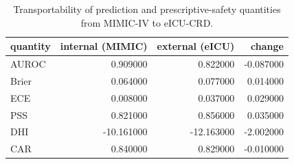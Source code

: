 \begin{table}
\caption{Transportability of prediction and prescriptive-safety quantities from MIMIC-IV to eICU-CRD.}
\label{tab:external}
\begin{tabular}{lrrr}
\toprule
quantity & internal (MIMIC) & external (eICU) & change \\
\midrule
AUROC & 0.909000 & 0.822000 & -0.087000 \\
Brier & 0.064000 & 0.077000 & 0.014000 \\
ECE & 0.008000 & 0.037000 & 0.029000 \\
PSS & 0.821000 & 0.856000 & 0.035000 \\
DHI & -10.161000 & -12.163000 & -2.002000 \\
CAR & 0.840000 & 0.829000 & -0.010000 \\
\bottomrule
\end{tabular}
\end{table}
